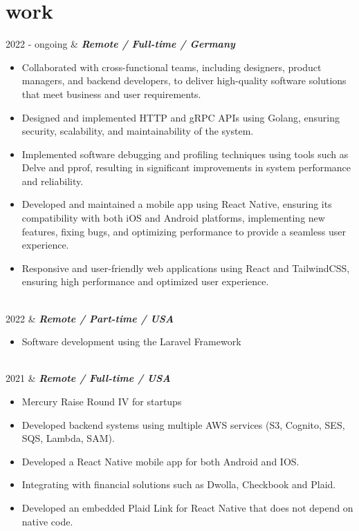 \documentclass[]{cv-mauri}
\begin{document}
\section*{work}
\begin{tabularcv}
	2022 - ongoing   &   
					\textbf{\textit{Remote / Full-time / Germany}}

			\begin{itemize}
				\item Collaborated with cross-functional teams, including designers, product managers, and backend developers, to deliver high-quality software solutions that meet business and user requirements.
				\item Designed and implemented HTTP and gRPC APIs using Golang, ensuring security, scalability, and maintainability of the system.
				\item Implemented software debugging and profiling techniques using tools such as Delve and pprof, resulting in significant improvements in system performance and reliability.
				\item Developed and maintained a mobile app using React Native, ensuring its compatibility with both iOS and Android platforms, implementing new features, fixing bugs, and optimizing performance to provide a seamless user experience.
				\item Responsive and user-friendly web applications using React and TailwindCSS, ensuring high performance and optimized user experience.
			\end{itemize}
					\\[\vspacepar]
	2022   &   
					\textbf{\textit{Remote / Part-time / USA}}

			\begin{itemize}
				\item Software development using the Laravel Framework 
			\end{itemize}
					\\[\vspacepar]
	2021   &   
					\textbf{\textit{Remote / Full-time / USA}}

			\begin{itemize}
				\item Mercury Raise Round IV for startups
				\item Developed backend systems using multiple AWS services (S3, Cognito, SES, SQS, Lambda, SAM).
				\item Developed a React Native mobile app for both Android and IOS.
				\item Integrating with financial solutions such as Dwolla, Checkbook and Plaid.
				\item  Developed an embedded Plaid Link for React Native that does not depend on native code.
			\end{itemize}
					\\[\vspacepar]
	

\end{tabularcv}
\end{document}
